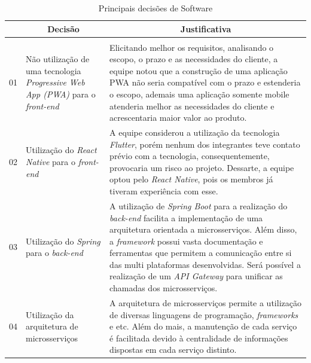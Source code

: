 \begin{apendicesenv}
\vspace{1cm}

\begin{table}[H]
    \centering
    \caption{Principais decisões de Software}
    \label{tab:decisoes_software}
    \begin{adjustbox}{max width = 1\textwidth}
        \begin{tabular}{|c|p{5cm}|p{10cm}|}
            \hline
            \rowcolor[HTML]{A8DADC}
            \multicolumn{1}{|c}{\textbf{\#}} &
            \multicolumn{1}{|c}{\textbf{Decisão}} & \multicolumn{1}{|c|}{\textbf{Justificativa}} \\ 
            \hline
            \rowcolor[HTML]{1D3557}\multicolumn{3}{|c|}{\textbf{\color{white}Ponto de Controle 1}} \\ \hline
            01 & Não utilização de uma tecnologia \textit{Progressive Web App (PWA)} para o \textit{front-end} & Elicitando melhor os requisitos, analisando o escopo, o prazo e as necessidades do cliente, a equipe notou que a construção de uma aplicação PWA não seria compatível com o prazo e estenderia o escopo, ademais uma aplicação somente mobile atenderia melhor as necessidades do cliente e acrescentaria maior valor ao produto.  \\ 
            \hline
            02 & Utilização do \textit{React Native} para o \textit{front-end} & A equipe considerou a utilização da tecnologia \textit{Flutter}, porém nenhum dos integrantes teve contato prévio com a tecnologia, consequentemente, provocaria um risco ao projeto. Dessarte, a equipe optou pelo \textit{React Native}, pois os membros já tiveram experiência com esse. \\ 
            \hline
            03 & Utilização do \textit{Spring} para o \textit{back-end} & A utilização de \textit{Spring Boot} para a realização do \emph{back-end} facilita a implementação de uma arquitetura orientada a microsserviços. Além disso, a \textit{framework} possui vasta documentação e ferramentas que permitem a comunicação entre si das multi plataformas desenvolvidas. Será possível a realização de um \textit{API Gateway} para unificar as chamadas dos microsserviços. \\ 
            \hline
            04 & Utilização da arquitetura de microsserviços & A arquitetura de microsserviços permite a utilização de diversas linguagens de programação, \textit{frameworks} e etc. Além do mais, a manutenção de cada serviço é facilitada devido à centralidade de informações dispostas em cada serviço distinto.\\ 

\end{tabular}
\end{adjustbox}
\end{table}
\end{apendicesenv}
